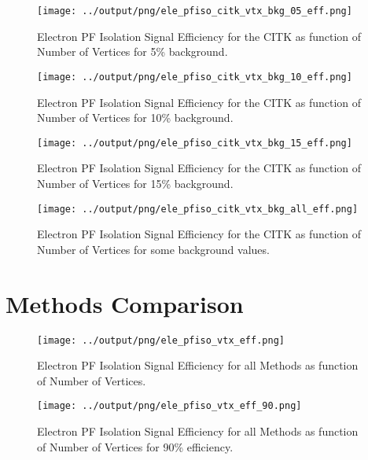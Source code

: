 \documentclass[11pt]{book}
\begin{document}
\begin{figure}[htb]
\centering
\texttt{[image: ../output/png/ele\_pfiso\_citk\_vtx\_bkg\_05\_eff.png]}
\caption{Electron PF Isolation Signal Efficiency for the CITK as function of Number of Vertices for 5\% background.}
\label{fig:ele_pfiso_vtx_eff_citk_bkg_05_eff}
\end{figure}

\begin{figure}[htb]
\centering
\texttt{[image: ../output/png/ele\_pfiso\_citk\_vtx\_bkg\_10\_eff.png]}
\caption{Electron PF Isolation Signal Efficiency for the CITK as function of Number of Vertices for 10\% background.}
\label{fig:ele_pfiso_vtx_eff_citk_bkg_10_eff}
\end{figure}

\begin{figure}[htb]
\centering
\texttt{[image: ../output/png/ele\_pfiso\_citk\_vtx\_bkg\_15\_eff.png]}
\caption{Electron PF Isolation Signal Efficiency for the CITK as function of Number of Vertices for 15\% background.}
\label{fig:ele_pfiso_vtx_eff_citk_bkg_15_eff}
\end{figure}

\begin{figure}[htb]
\centering
\texttt{[image: ../output/png/ele\_pfiso\_citk\_vtx\_bkg\_all\_eff.png]}
\caption{Electron PF Isolation Signal Efficiency for the CITK as function of Number of Vertices for some background values.}
\label{fig:ele_pfiso_vtx_eff_citk_bkg_all_eff}
\end{figure}
\clearpage

\section{Methods Comparison}
\begin{figure}[htb]
\centering
\texttt{[image: ../output/png/ele\_pfiso\_vtx\_eff.png]}
\caption{Electron PF Isolation Signal Efficiency for all Methods as function of Number of Vertices.}
\label{fig:ele_pfiso_vtx_eff}
\end{figure}

\begin{figure}[htb]
\centering
\texttt{[image: ../output/png/ele\_pfiso\_vtx\_eff\_90.png]}
\caption{Electron PF Isolation Signal Efficiency for all Methods as function of Number of Vertices for 90\% efficiency.}
\label{fig:ele_pfiso_vtx_eff_90}
\end{figure}
\end{document}
